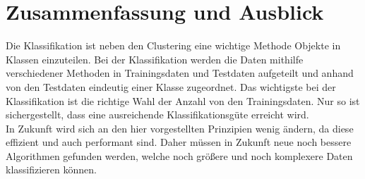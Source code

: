 \section{Zusammenfassung und Ausblick}
Die Klassifikation ist neben den Clustering eine wichtige Methode Objekte in Klassen einzuteilen. Bei der Klassifikation werden die Daten mithilfe verschiedener Methoden in Trainingsdaten und Testdaten aufgeteilt und anhand von den Testdaten eindeutig einer Klasse zugeordnet. Das wichtigste bei der Klassifikation ist die richtige Wahl der Anzahl von den Trainingsdaten. Nur so ist sichergestellt, dass eine ausreichende Klassifikationsgüte erreicht wird.\\
In Zukunft wird sich an den hier vorgestellten Prinzipien wenig ändern, da diese effizient und auch performant sind. Daher müssen in Zukunft neue noch bessere Algorithmen gefunden werden, welche noch größere und noch komplexere Daten klassifizieren können. 





 
